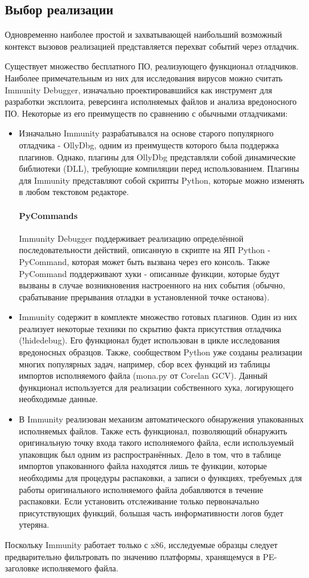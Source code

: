 \subsection {Выбор реализации}
Одновременно наиболее простой и захватывающей наибольший возможный контекст вызовов реализацией представляется перехват событий через отладчик.

Существует множество бесплатного ПО, реализующего функционал отладчиков. Наиболее примечательным из них для исследования вирусов можно считать Immunity Debugger, изначально проектировавшийся как инструмент для разработки эксплоита, реверсинга исполняемых файлов и анализа вредоносного ПО. Некоторые из его преимуществ по сравнению с обычными отладчиками:
\begin {itemize}
	\item Изначально Immunity разрабатывался на основе старого популярного отладчика - OllyDbg, одним из преимуществ которого была поддержка плагинов. Однако, плагины для OllyDbg представляли собой динамические библиотеки (DLL), требующие компиляции перед использованием. Плагины для Immunity представляют собой скрипты Python, которые можно изменять в любом текстовом редакторе.
	\paragraph {PyCommands}
Immunity Debugger поддерживает реализацию определённой последовательности действий, описанную в скрипте на ЯП Python - PyCommand, которая может быть вызвана через его консоль. Также PyCommand поддерживают хуки - описанные функции, которые будут вызваны в случае возникновения настроенного на них события (обычно, срабатывание прерывания отладки в установленной точке останова).
	\item Immunity содержит в комплекте множество готовых плагинов. Один из них реализует некоторые техники по скрытию факта присутствия отладчика (!hidedebug). Его функционал будет использован в цикле исследования вредоносных образцов. Также, сообществом Python уже созданы реализации многих популярных задач, например, сбор всех функций из таблицы импортов исполняемого файла (mona.py от Corelan GCV). Данный функционал используется для реализации собственного хука, логирующего необходимые данные.
	\item В Immunity реализован механизм автоматического обнаружения упакованных исполняемых файлов. Также есть функционал, позволяющий обнаружить оригинальную точку входа такого исполняемого файла, если используемый упаковщик был одним из распространённых. Дело в том, что в таблице импортов упакованного файла находятся лишь те функции, которые необходимы для процедуры распаковки, а записи о функциях, требуемых для работы оригинального исполняемого файла добавляются в течение распаковки. Если установить отслеживание только первоначально присутствующих функций, большая часть информативности логов будет утеряна.
\end {itemize}
Поскольку Immunity работает только с x86, исследуемые образцы следует предварительно фильтровать по значению платформы, хранящемуся в PE-заголовке исполняемого файла.
